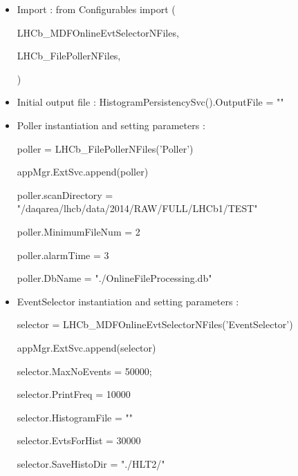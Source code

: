 \begin{itemize}
\item Import : from Configurables import ( \par
              \hspace{20mm} LHCb\_MDFOnlineEvtSelectorNFiles,\par
              \hspace{20mm} LHCb\_FilePollerNFiles,\par
                            )  \par
\item Initial output file : HistogramPersistencySvc().OutputFile = "" \par
\item Poller instantiation and setting parameters : \par
                 \hspace{20mm}poller = LHCb\_FilePollerNFiles('Poller')\par
                 \hspace{20mm}appMgr.ExtSvc.append(poller)\par
                 \hspace{19mm}poller.scanDirectory = "/daqarea/lhcb/data/2014/RAW/FULL/LHCb1/TEST"  \par
                 \hspace{20mm}poller.MinimumFileNum = 2\par
                 \hspace{20mm}poller.alarmTime = 3\par
                 \hspace{20mm}poller.DbName = "./OnlineFileProcessing.db"\par

\item EventSelector instantiation and setting parameters : \par
               \hspace{17mm}selector = LHCb\_MDFOnlineEvtSelectorNFiles('EventSelector')\par
               \hspace{20mm}appMgr.ExtSvc.append(selector)\par
               \hspace{20mm}selector.MaxNoEvents = 50000;\par
               \hspace{20mm}selector.PrintFreq = 10000\par
               \hspace{20mm}selector.HistogramFile = ""\par
               \hspace{20mm}selector.EvtsForHist = 30000 \par
               \hspace{20mm}selector.SaveHistoDir = "./HLT2/" \par

\end{itemize}

